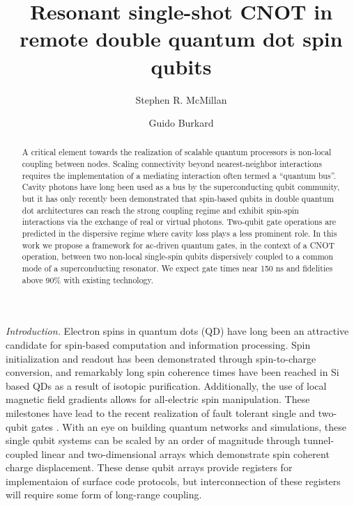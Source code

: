 \documentclass[%
 reprint,
 amsmath,amssymb,
 aps,
prl,
longbibliography
]{revtex4-1}
\begin{document}
\title{Resonant single-shot CNOT in remote double quantum dot spin qubits}


\author{Stephen R. McMillan}

\author{Guido Burkard}


\begin{abstract}
A critical element towards the realization of scalable quantum processors is non-local coupling between nodes. Scaling connectivity beyond nearest-neighbor interactions requires the implementation of a mediating interaction often termed a “quantum bus”. Cavity photons have long been used as a bus by the superconducting qubit community, but it has only recently been demonstrated that spin-based qubits in double quantum dot architectures can reach the strong coupling regime and exhibit spin-spin interactions via the exchange of real or virtual photons. Two-qubit gate operations are predicted in the dispersive regime where cavity loss plays a less prominent role. In this work we propose a framework for ac-driven quantum gates, in the context of a CNOT operation, between two non-local single-spin qubits dispersively coupled to a common mode of a superconducting resonator. We expect gate times near 150 ns and fidelities above 90\% with existing technology.
\end{abstract}


\maketitle

\textit{Introduction.} Electron spins in quantum dots (QD) have long been an attractive candidate for spin-based computation and information processing\cite{Loss1998, Hanson2007}. Spin initialization and readout has been demonstrated through spin-to-charge conversion\cite{Ono2002, Elzerman2004}, and remarkably long spin coherence times have been reached in Si based QDs as a result of isotopic purification\cite{Veldhorst2014}. Additionally, the use of local magnetic field gradients allows for all-electric spin manipulation\cite{Tokura2006, Pioro-Ladriere2008}. These milestones have lead to the recent realization of fault tolerant single and two-qubit gates \cite{Takeda2016, Yoneda2018, Mills2022, Xue2022, Noiri2022, Mills2022a}. With an eye on building quantum networks\cite{Fowler2012} and simulations\cite{Byrnes2008}, these single qubit systems can be scaled by an order of magnitude through tunnel-coupled linear and two-dimensional arrays which demonstrate spin coherent charge displacement\cite{Fujita2017,Flentje2017, Mukhopadhyay2018,Mortemousque2020}. These dense qubit arrays provide registers for implementaion of surface code protocols, but interconnection of these registers will require some form of long-range coupling\cite{Vandersypen2017}.
\end{document}
